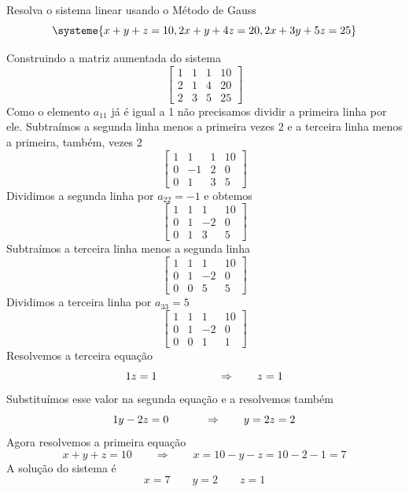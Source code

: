 \begin{exemplos}[2]
    \begin{exemplo}
        Resolva o sistema linear usando o Método de Gauss
        \[\systeme{
            	x  + y  + z  = 10,
            	2x + y  + 4z = 20,
            	2x + 3y + 5z = 25
        }\]
                
        Construindo a matriz aumentada do sistema
        \[\left[
            \begin{array}{rrr|r}
                1 & 1 & 1 & 10 \\ 
                2 & 1 & 4 & 20 \\ 
                2 & 3 & 5 & 25
            \end{array} 
            \right]
        \]
        Como o elemento $a_{11}$ já é igual a 1 não precisamos dividir a primeira linha por ele. 
        Subtraímos a segunda linha menos a primeira vezes 2 e a terceira linha menos a primeira, também, vezes 2
        \[\left[
            \begin{array}{rrr|r}
                1 &  1 & 1 & 10 \\ 
                0 & -1 & 2 & 0 \\ 
                0 &  1 & 3 & 5
            \end{array} 
            \right]
        \]
        Dividimos a segunda linha por $a_{22}=-1$ e obtemos
        \[\left[
            \begin{array}{rrr|r}
                1 &  1 &  1 & 10 \\ 
                0 &  1 & -2 & 0  \\ 
                0 &  1 &  3 & 5
            \end{array} 
            \right]
        \]
        Subtraímos a terceira linha menos a segunda linha
        \[\left[
            \begin{array}{rrr|r}
                1 &  1 &  1 & 10 \\ 
                0 &  1 & -2 & 0  \\ 
                0 &  0 &  5 & 5
            \end{array} 
            \right]
        \]
        Dividimos a terceira linha por $a_{33}=5$
        \[\left[
            \begin{array}{rrr|r}
                1 &  1 &  1 & 10 \\ 
                0 &  1 & -2 & 0  \\ 
                0 &  0 &  1 & 1
            \end{array} 
            \right]
        \]
        Resolvemos a terceira equação
        \[ \makebox[0pt][l]{$1z = 1$}\phantom{x + y + z = 10} \qquad \Rightarrow \qquad z = 1  \]
        Substituímos esse valor na segunda equação e a resolvemos também
        \[ \makebox[0pt][l]{$1y - 2z = 0$}\phantom{x + y + z = 10} \qquad \Rightarrow \qquad y = 2z = 2 \]
        Agora resolvemos a primeira equação
        \[ x + y + z = 10 \qquad \Rightarrow \qquad x = 10 - y - z = 10 -2 -1 = 7 \]
        A solução do sistema é
        \[ x = 7 \qquad y = 2 \qquad z = 1 \]
    \end{exemplo}
                            
\end{exemplos}

